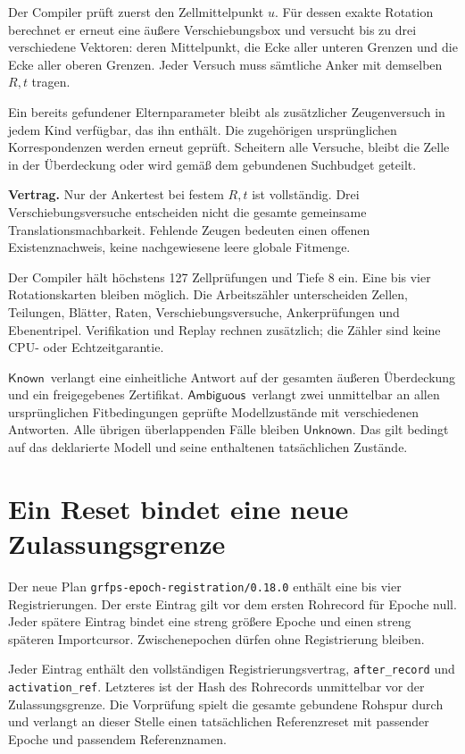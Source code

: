 \documentclass[11pt,a4paper]{article}
\newcommand{\Known}{\ensuremath{\mathsf{Known}}}
\newcommand{\Unknown}{\ensuremath{\mathsf{Unknown}}}
\newcommand{\Ambiguous}{\ensuremath{\mathsf{Ambiguous}}}
\newcommand{\contract}[1]{\vspace{3pt}\noindent\colorbox{pale}{\parbox{\dimexpr\linewidth-2\fboxsep}{\textbf{Vertrag.} #1}}\vspace{5pt}}
\newcommand{\nextsection}[2]{\clearpage{\color{accent}\small\textsf{#1}}\section{#2}}
\begin{document}
Der Compiler prüft zuerst den Zellmittelpunkt $u$. Für dessen
exakte Rotation berechnet er erneut eine äußere Verschiebungsbox
und versucht bis zu drei verschiedene Vektoren: deren Mittelpunkt,
die Ecke aller unteren Grenzen und die Ecke aller oberen Grenzen.
Jeder Versuch muss sämtliche Anker mit demselben $R,t$ tragen.

Ein bereits gefundener Elternparameter bleibt als zusätzlicher
Zeugenversuch in jedem Kind verfügbar, das ihn enthält. Die
zugehörigen ursprünglichen Korrespondenzen werden erneut geprüft.
Scheitern alle Versuche, bleibt die Zelle in der Überdeckung oder
wird gemäß dem gebundenen Suchbudget geteilt.

\contract{Nur der Ankertest bei festem $R,t$ ist vollständig.
Drei Verschiebungsversuche entscheiden nicht die gesamte gemeinsame
Translationsmachbarkeit. Fehlende Zeugen bedeuten einen offenen
Existenznachweis, keine nachgewiesene leere globale Fitmenge.}

Der Compiler hält höchstens 127 Zellprüfungen und Tiefe 8 ein.
Eine bis vier Rotationskarten bleiben möglich. Die Arbeitszähler
unterscheiden Zellen, Teilungen, Blätter, Raten, Verschiebungsversuche,
Ankerprüfungen und Ebenentripel. Verifikation und Replay rechnen
zusätzlich; die Zähler sind keine CPU- oder Echtzeitgarantie.

\Known\ verlangt eine einheitliche Antwort auf der gesamten äußeren
Überdeckung und ein freigegebenes Zertifikat. \Ambiguous\ verlangt
zwei unmittelbar an allen ursprünglichen Fitbedingungen geprüfte
Modellzustände mit verschiedenen Antworten. Alle übrigen
überlappenden Fälle bleiben \Unknown. Das gilt bedingt auf das
deklarierte Modell und seine enthaltenen tatsächlichen Zustände.

\nextsection{109 / REFERENZEPOCHEN}{Ein Reset bindet eine neue Zulassungsgrenze}
Der neue Plan \texttt{grfps-epoch-registration/0.18.0} enthält eine
bis vier Registrierungen. Der erste Eintrag gilt vor dem ersten
Rohrecord für Epoche null. Jeder spätere Eintrag bindet eine
streng größere Epoche und einen streng späteren Importcursor.
Zwischenepochen dürfen ohne Registrierung bleiben.

Jeder Eintrag enthält den vollständigen Registrierungsvertrag,
\texttt{after\_record} und \texttt{activation\_ref}. Letzteres
ist der Hash des Rohrecords unmittelbar vor der Zulassungsgrenze.
Die Vorprüfung spielt die gesamte gebundene Rohspur durch und
verlangt an dieser Stelle einen tatsächlichen Referenzreset mit
passender Epoche und passendem Referenznamen.
\end{document}
